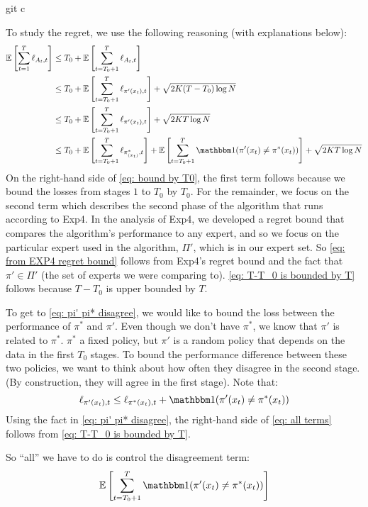 git c\documentclass[11pt]{article}
\begin{document}
To study the regret, we use the following reasoning (with explanations below):
\begin{align}
\E{\sum_{t=1}^T\ell_{A_t,t}} &\le T_0 +\E{\sum_{t=T_0+1}^T\ell_{A_t,t}}\label{eq: bound by T0}\\
& \le T_0 + \E{\sum_{t=T_0+1}^T\ell_{\pi'(x_t),t}}+ \sqrt{2K(T-T_0) \log{N}} \label{eq: from EXP4 regret bound}\\
& \le T_0 + \E{\sum_{t=T_0+1}^T\ell_{\pi'(x_t),t}}+  \sqrt{2KT\log{N}}\label{eq: T-T_0 is bounded by T}\\
&\le T_0 + \E{\sum_{t=T_0+1}^T \ell_{\pi^*_{(x_t)},t}} + \E{\sum_{t=T_0+1}^T{\ind(\pi'(x_t)\neq \pi^*(x_t))}} + \sqrt{2KT\log{N}}
\label{eq: all terms}
\end{align}
On the right-hand side of \eqref{eq: bound by T0}, the first term follows because we bound the losses from stages $1$ to $T_0$ by $T_0$. For the remainder, we focus on the second term which describes the second phase of the algorithm that runs according to Exp4. In the analysis of Exp4, we developed a regret bound that compares the algorithm's performance to any expert, and so we focus on the particular expert used in the algorithm, $\Pi'$, which is in our expert set. So \eqref{eq: from EXP4 regret bound} follows from Exp4's regret bound and the fact that $\pi' \in \Pi'$ (the set of experts we were comparing to). \eqref{eq: T-T_0 is bounded by T} follows because $T-T_0$ is upper bounded by $T$. 

To get to \eqref{eq: pi' pi* disagree}, we would like to bound the loss between the performance of $\pi^*$ and $\pi'$. Even though we don't have $\pi^*$, we know that $\pi'$ is related to $\pi^*$. $\pi^*$ a fixed policy, but $\pi'$ is a random policy that depends on the data in the first $T_0$ stages. To bound the performance difference between these two policies, we want to think about how often they disagree in the second stage. (By construction, they will agree in the first stage). Note that:
\begin{equation}
\ell_{\pi'(x_t),t}\le \ell_{\pi^*(x_t),t} + \ind(\pi'(x_t)\neq \pi^*(x_t))\label{eq: pi' pi* disagree}
\end{equation}
Using the fact in \eqref{eq: pi' pi* disagree}, the right-hand side of \eqref{eq: all terms} follows from \eqref{eq: T-T_0 is bounded by T}. 

So ``all'' we have to do is control the disagreement term:
\begin{equation}
\E{\sum_{t=T_0+1}^T\ind(\pi'(x_t)\neq \pi^*(x_t))} \label{eq: disagreement term}
\end{equation}
\end{document}

